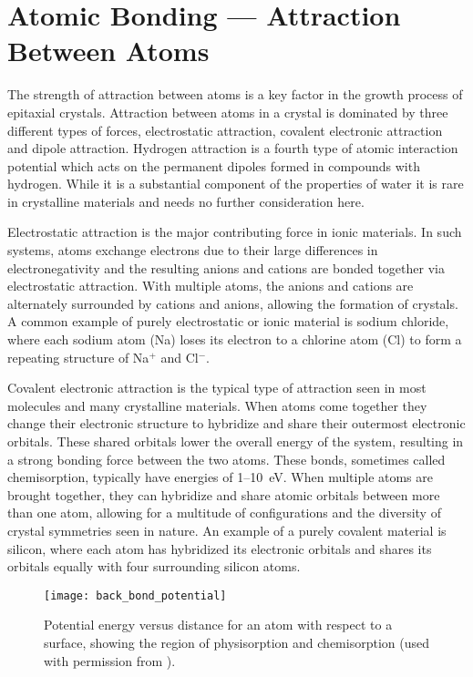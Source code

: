 \section{Atomic Bonding --- Attraction Between Atoms}
The strength of attraction between atoms is a key factor in the growth process of epitaxial crystals.
Attraction between atoms in a crystal is dominated by three different types of forces, electrostatic attraction, covalent electronic attraction and dipole attraction. Hydrogen attraction is a fourth type of atomic interaction potential which acts on the permanent dipoles formed in compounds with hydrogen.
While it is a substantial component of the properties of water it is rare in crystalline materials and needs no further consideration here.

Electrostatic attraction is the major contributing force in ionic materials.
In such systems, atoms exchange electrons due to their large differences in electronegativity and the resulting anions and cations are bonded together via electrostatic attraction.
With multiple atoms, the anions and cations are alternately surrounded by cations and anions, allowing the formation of crystals.
A common example of purely electrostatic or ionic material is sodium chloride, where each sodium atom (Na) loses its electron to a chlorine atom (Cl) to form a repeating structure of Na\(^+\) and Cl\(^-\).

Covalent electronic attraction is the typical type of attraction seen in most molecules and many crystalline materials.
When atoms come together they change their electronic structure to hybridize and share their outermost electronic orbitals.
These shared orbitals lower the overall energy of the system, resulting in a strong bonding force between the two atoms.
These bonds, sometimes called chemisorption, typically have energies of 1--10~eV\cite{oura2010surface}.
When multiple atoms are brought together, they can hybridize and share atomic orbitals between more than one atom, allowing for a multitude of configurations and the diversity of crystal symmetries seen in nature.
An example of a purely covalent material is silicon, where each atom has hybridized its electronic orbitals and shares its orbitals equally with four surrounding silicon atoms.
\begin{figure}
 \centering \texttt{[image: back\_bond\_potential]}
 \caption[Energy potentials between two atoms]{\label{fig:back_bond_potential}Potential energy versus distance for an atom with respect to a surface, showing the region of physisorption and chemisorption (used with permission from \cite{ohring2001materials}).}
\end{figure}

